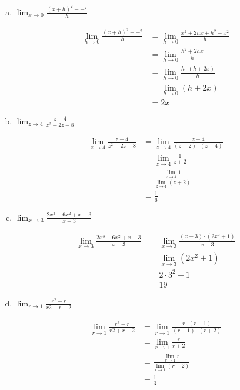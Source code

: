 \documentclass[a4paper, 12pt]{article}
\begin{document}
\begin{enumerate}
\begin{enumerate}[(a)]
        \item  $\lim_{x \to 0} \frac{(x+h)^2 - -^2}{h}$
        
        \begin{align*}
            \lim_{h \to 0} \frac{(x+h)^2 - -^2}{h} &= \lim_{h \to 0} \frac{x^2 + 2hx + h^2 -x^2}{h}\\
            &= \lim_{h \to 0} \frac{h^2 + 2hx}{h}\\
            &= \lim_{h \to 0} \frac{h\cdot (h + 2x)}{h}\\
            &= \lim_{h \to 0} (h + 2x)\\
            &= 2x
        \end{align*}

        \item $\lim_{z \to 4} \frac{z-4}{z^2 - 2z - 8}$
        
        \begin{align*}
            \lim_{z \to 4} \frac{z-4}{z^2 - 2z - 8} &= \lim_{z \to 4} \frac{z-4}{(z+2) \cdot (z-4)}\\
            &= \lim_{z \to 4} \frac{1}{z+2}\\
            &= \frac{\lim_{z \to 4}1}{\lim_{z \to 4}(z+2)} \\
            &= \frac{1}{6}
        \end{align*}
        
        \item $\lim_{x \to 3} \frac{2x^3 - 6x^2 + x - 3}{x-3}$
        
        \begin{align*}
            \lim_{x \to 3} \frac{2x^3 - 6x^2 + x - 3}{x-3} &=
            \lim_{x \to 3} \frac{(x-3) \cdot (2x^2 +1)}{x-3}\\
            &= \lim_{x \to 3} (2x^2 +1) \\
            &= 2 \cdot 3^2 + 1 \\
            &= 19
        \end{align*}

        \item $\lim_{r \to 1} \frac{r^2 - r}{r2 + r - 2}$
        
        \begin{align*}
            \lim_{r \to 1} \frac{r^2 - r}{r2 + r - 2} &=
            \lim_{r \to 1} \frac{r \cdot (r - 1)}{(r-1) \cdot (r + 2)}\\
            &= \lim_{r \to 1} \frac{r}{r + 2} \\
            &= \frac{\lim_{r \to 1}r}{\lim_{r \to 1}(r + 2)}\\
            &= \frac{1}{3}
        \end{align*}


\end{enumerate}
\end{enumerate}
\end{document}
